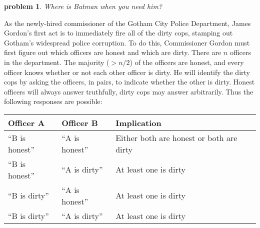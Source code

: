 \documentclass[10pt]{article}
\newtheorem{problem}{\sc\color{cit}problem}
\begin{document}
\begin{problem} Where is Batman when you need him? \end{problem}
As the newly-hired commissioner of the Gotham City Police Department, James Gordon's first act is to immediately fire all of the dirty cops, stamping out Gotham's widespread police corruption. To do this, Commissioner Gordon must first figure out which officers are honest and which are dirty. There are $n$ officers in the department. The majority ($> n/2$) of the officers are honest, and every officer knows whether or not each other officer is dirty. He will identify the dirty cops by asking the officers, in pairs, to indicate whether the other is dirty. Honest officers will always answer truthfully, dirty cops may answer arbitrarily. Thus the following responses are possible:

\begin{tabular}{lll}
Officer A & Officer B & Implication \\
\hline
``B is honest'' & ``A is honest'' & Either both are honest or both are dirty \\
``B is honest'' & ``A is dirty'' & At least one is dirty \\
``B is dirty'' & ``A is honest'' & At least one is dirty \\
``B is dirty'' & ``A is dirty'' & At least one is dirty
\end{tabular}
\end{document}
